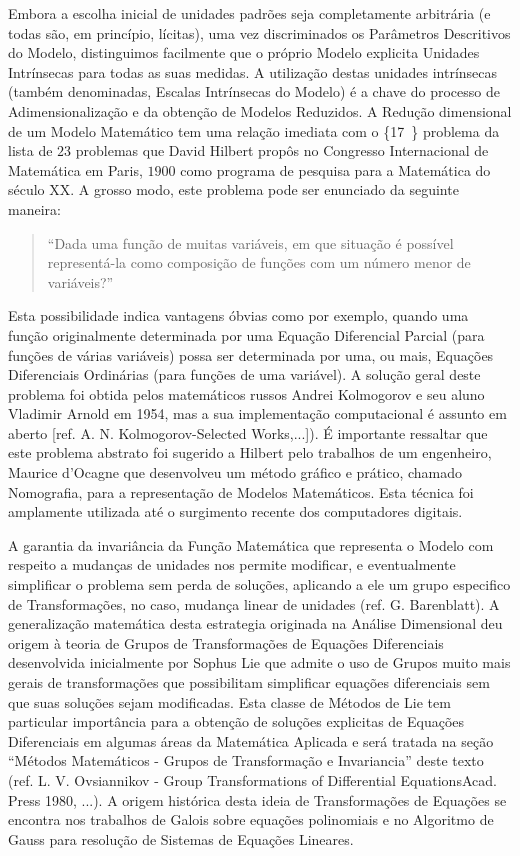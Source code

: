     Embora a escolha inicial de unidades padrões seja completamente arbitrária (e todas são, em princípio, lícitas), uma vez discriminados os Parâmetros Descritivos do Modelo, distinguimos facilmente que o próprio Modelo explicita Unidades Intrínsecas para todas as suas medidas. A utilização destas unidades intrínsecas (também denominadas, Escalas Intrínsecas do Modelo) é a chave do processo de Adimensionalização e da obtenção de Modelos Reduzidos. A Redução dimensional de um Modelo Matemático tem uma relação imediata com o \{17\textordmasculine\ \} problema da lista de \(23\) problemas que David Hilbert propôs no Congresso Internacional de Matemática em Paris, \(1900\) como programa de pesquisa para a Matemática do século XX. A grosso modo, este problema pode ser enunciado da seguinte maneira:
    \begin{quotation}
    ``Dada uma função de muitas variáveis, em que situação é possível representá-la como composição de funções com um número menor de variáveis?''
    \end{quotation}
    Esta possibilidade indica vantagens óbvias como por exemplo, quando uma função originalmente determinada por uma Equação Diferencial Parcial (para funções de várias variáveis) possa ser determinada por uma, ou mais, Equações Diferenciais Ordinárias (para funções de uma variável). A solução geral deste problema foi obtida pelos matemáticos russos Andrei Kolmogorov e seu aluno Vladimir Arnold em 1954, mas a sua implementação computacional é assunto em aberto [ref. A. N. Kolmogorov-Selected Works,...]). É importante ressaltar que este problema abstrato foi sugerido a Hilbert pelo trabalhos de um engenheiro, Maurice d’Ocagne que desenvolveu um método gráfico e prático, chamado Nomografia, para a representação de Modelos Matemáticos. Esta técnica foi amplamente utilizada até o surgimento recente dos computadores digitais.

    A garantia da invariância da Função Matemática que representa o Modelo com respeito a mudanças de unidades nos permite modificar, e eventualmente simplificar o problema sem perda de soluções, aplicando a ele um grupo especifico de Transformações, no caso, mudança linear de unidades (ref. G. Barenblatt). A generalização matemática desta estrategia originada na Análise Dimensional deu origem à teoria de Grupos de Transformações de Equações Diferenciais desenvolvida inicialmente por Sophus Lie que admite o uso de Grupos muito mais gerais de transformações que possibilitam simplificar equações diferenciais sem que suas soluções sejam modificadas. Esta classe de Métodos de Lie tem particular importância para a obtenção de soluções explicitas de Equações Diferenciais em algumas áreas da Matemática Aplicada e será tratada na seção ``Métodos Matemáticos - Grupos de Transformação e Invariancia'' deste texto (ref. L. V. Ovsiannikov - Group Transformations of Differential EquationsAcad. Press 1980, ...). A origem histórica desta ideia de Transformações de Equações se encontra nos trabalhos de Galois sobre equações polinomiais e no Algoritmo de Gauss para resolução de Sistemas de Equações Lineares.

